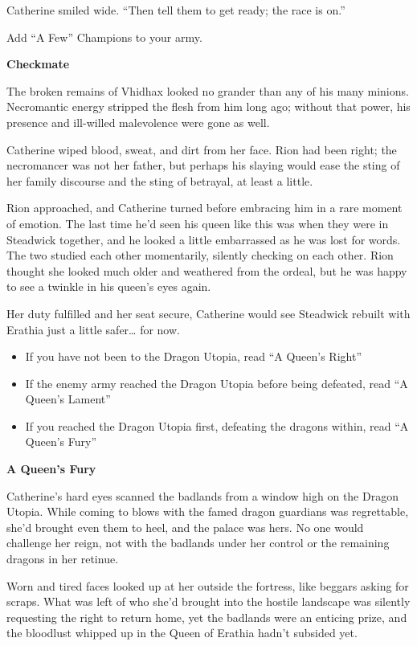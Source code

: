 \begin{multicols*}{2}
Catherine smiled wide. ``Then tell them to get ready; the race is on.''

\textcolor{darkcandyapplered}{Add ``A Few'' Champions to your army.}

\textbf{Checkmate}

The broken remains of Vhidhax looked no grander than any of his many minions. Necromantic energy stripped the flesh from him long ago; without that power, his presence and ill-willed malevolence were gone as well.

Catherine wiped blood, sweat, and dirt from her face. Rion had been right; the necromancer was not her father, but perhaps his slaying would ease the sting of her family discourse and the sting of betrayal, at least a little. 

Rion approached, and Catherine turned before embracing him in a rare moment of emotion. The last time he'd seen his queen like this was when they were in Steadwick together, and he looked a little embarrassed as he was lost for words. The two studied each other momentarily, silently checking on each other. Rion thought she looked much older and weathered from the ordeal, but he was happy to see a twinkle in his queen's eyes again.

Her duty fulfilled and her seat secure, Catherine would see Steadwick rebuilt with Erathia just a little safer… for now.

\begin{itemize}
    \item \textcolor{darkcandyapplered}{If you have not been to the Dragon Utopia, read ``A Queen's Right''}
    \item \textcolor{darkcandyapplered}{If the enemy army reached the Dragon Utopia before being defeated, read ``A Queen's Lament''}
    \item \textcolor{darkcandyapplered}{If you reached the Dragon Utopia first, defeating the dragons within, read ``A Queen's Fury''}
\end{itemize}

\textbf{A Queen's Fury}

Catherine's hard eyes scanned the badlands from a window high on the Dragon Utopia. While coming to blows with the famed dragon guardians was regrettable, she'd brought even them to heel, and the palace was hers. No one would challenge her reign, not with the badlands under her control or the remaining dragons in her retinue.

Worn and tired faces looked up at her outside the fortress, like beggars asking for scraps. What was left of who she'd brought into the hostile landscape was silently requesting the right to return home, yet the badlands were an enticing prize, and the bloodlust whipped up in the Queen of Erathia hadn't subsided yet.


\end{multicols*}
